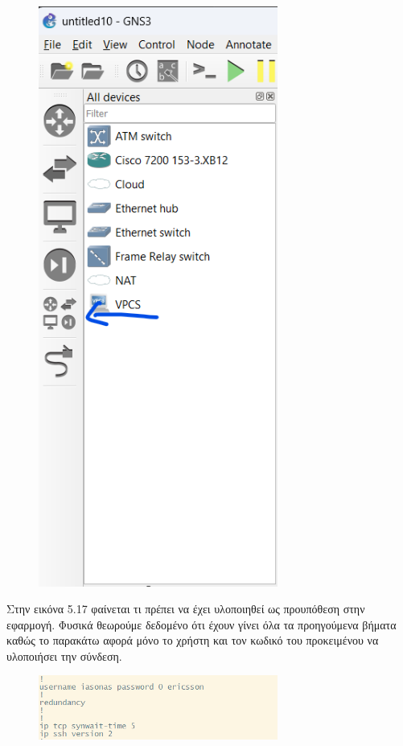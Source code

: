 \FloatBarrier

\begin{figure}[htb]
	\centering
	\includegraphics[width=0.7\textwidth]{graphics/browse_devices.png}
	\caption{ }
\end{figure}

\FloatBarrier

Στην  εικόνα 5.17 φαίνεται τι πρέπει να έχει υλοποιηθεί ως προυπόθεση στην εφαρμογή. Φυσικά θεωρούμε δεδομένο ότι έχουν γίνει όλα τα προηγούμενα βήματα καθώς το παρακάτω αφορά μόνο το χρήστη και τον κωδικό του προκειμένου να υλοποιήσει την  σύνδεση.
\FloatBarrier

\begin{figure}[htb]
	\centering
	\includegraphics[width=0.7\textwidth]{graphics/ssh.png}
	\caption{ }
\end{figure}

\FloatBarrier
